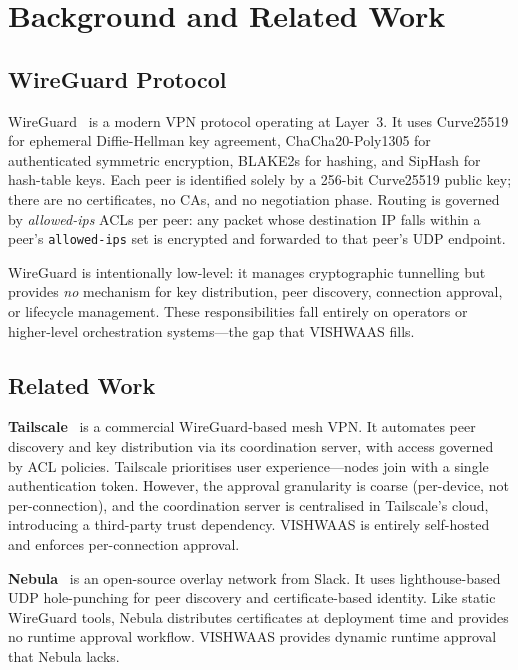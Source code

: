 \documentclass[conference]{IEEEtran}
\begin{document}
\section{Background and Related Work}
\label{sec:background}

\subsection{WireGuard Protocol}

WireGuard~\cite{donenfeld2017wireguard,wireguard-linux} is a modern VPN protocol
operating at Layer~3. It uses Curve25519 for ephemeral Diffie-Hellman key
agreement, ChaCha20-Poly1305 for authenticated symmetric encryption, BLAKE2s for
hashing, and SipHash for hash-table keys. Each peer is identified solely by a
256-bit Curve25519 public key; there are no certificates, no CAs, and no
negotiation phase. Routing is governed by \emph{allowed-ips} ACLs per peer: any
packet whose destination IP falls within a peer's \texttt{allowed-ips} set is
encrypted and forwarded to that peer's UDP endpoint.

WireGuard is intentionally low-level: it manages cryptographic tunnelling but
provides \emph{no} mechanism for key distribution, peer discovery, connection
approval, or lifecycle management. These responsibilities fall entirely on
operators or higher-level orchestration systems---the gap that VISHWAAS fills.

\subsection{Related Work}

\textbf{Tailscale}~\cite{tailscale} is a commercial WireGuard-based mesh VPN. It
automates peer discovery and key distribution via its coordination server, with
access governed by ACL policies. Tailscale prioritises user experience---nodes
join with a single authentication token. However, the approval granularity is
coarse (per-device, not per-connection), and the coordination server is
centralised in Tailscale's cloud, introducing a third-party trust dependency.
VISHWAAS is entirely self-hosted and enforces per-connection approval.

\textbf{Nebula}~\cite{nebula} is an open-source overlay network from Slack. It
uses lighthouse-based UDP hole-punching for peer discovery and certificate-based
identity. Like static WireGuard tools, Nebula distributes certificates at
deployment time and provides no runtime approval workflow.  VISHWAAS provides
dynamic runtime approval that Nebula lacks.
\end{document}
